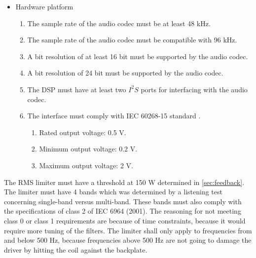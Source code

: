 \begin{itemize}
\item Hardware platform
\begin{enumerate}
\item [\textlabel{4}{samplerate44}] The sample rate of the audio codec must be at least 48 kHz.\\
\item [\textlabel{5}{samplerate96}] The sample rate of the audio codec must be compatible with 96 kHz.\\
\item [\textlabel{6}{resolution16}]  A bit resolution of  at least 16 bit must be supported by the audio codec.\\
\item [\textlabel{7}{resolution}]  A bit resolution of 24 bit must be supported by the audio codec.\\
\item [\textlabel{8}{I2S}] The DSP must have at least two $I^2S$ ports for interfacing with the audio codec.\\
\item [\textlabel{9}{IEC}] The interface must comply with IEC 60268-15 standard \citep{IEC60268}.
\begin{enumerate}
\item Rated output voltage: 0.5 V.
\item Minimum output voltage: 0.2 V.
\item Maximum output voltage: 2 V.
\end{enumerate}
\end{enumerate}
\end{itemize}


The RMS limiter must have a threshold at 150 W determined in \autoref{sec:feedback}. The limiter must have 4 bands which was determined by a listening test concerning single-band versus multi-band. These bands must also comply with the specifications of class 2 of IEC 6964 (2001). The reasoning for not meeting class 0 or class 1 requirements are because of time constraints, because it would require more tuning of the filters. The limiter shall only apply to frequencies from and below 500 Hz, because frequencies above 500 Hz are not going to damage the driver by hitting the coil against the backplate. 


